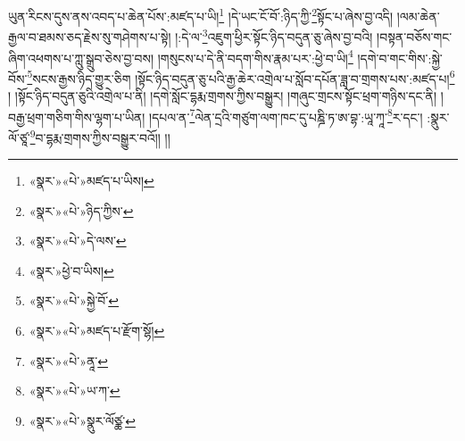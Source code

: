 ཡུན་རིངས་དུས་ནས་འབད་པ་ཆེན་པོས་:མཛད་པ་ཡི།\footnote{«སྣར་»«པེ་»མཛད་པ་ཡིས།} །དེ་ཡང་ངོ་བོ་:ཉིད་ཀྱི་\footnote{«སྣར་»«པེ་»ཉིད་ཀྱིས་}སྟོང་པ་ཞེས་བྱ་འདི། །ལམ་ཆེན་རྒྱལ་བ་ཐམས་ཅད་རྗེས་སུ་གཤེགས་པ་སྟེ། །:དེ་ལ་\footnote{«སྣར་»«པེ་»དེ་ལས་}འཇུག་ཕྱིར་སྟོང་ཉིད་བདུན་ཅུ་ཞེས་བྱ་བའི། །བསྟན་བཅོས་གང་ཞིག་འཕགས་པ་ཀླུ་སྒྲུབ་ཅེས་བྱ་བས། །གསུངས་པ་དེ་ནི་བདག་གིས་རྣམ་པར་:ཕྱེ་བ་ཡི།\footnote{«སྣར་»ཕྱེ་བ་ཡིས།} །དགེ་བ་གང་གིས་:སྐྱེ་བོས་\footnote{«སྣར་»«པེ་»སྐྱེ་བོ་}སངས་རྒྱས་ཉིད་གྱུར་ཅིག །སྟོང་ཉིད་བདུན་ཅུ་པའི་རྒྱ་ཆེར་འགྲེལ་པ་སློབ་དཔོན་ཟླ་བ་གྲགས་པས་:མཛད་པ།\footnote{«སྣར་»«པེ་»མཛད་པ་རྫོག་སྷོ།} ། །སྟོང་ཉིད་བདུན་ཅུའི་འགྲེལ་པ་ནི། །དགེ་སློང་དྷརྨ་གྲགས་ཀྱིས་བསྒྱུར། །གཞུང་གྲངས་སྟོང་ཕྲག་གཉིས་དང་ནི། །བརྒྱ་ཕྲག་གཅིག་གིས་ལྷག་པ་ཡིན། །དཔལ་ན་\footnote{«སྣར་»«པེ་»ནཱ་}ལེན་དྲའི་གཙུག་ལག་ཁང་དུ་པཎྜི་ཏ་ཨ་བྷ་:ཡཱ་ཀཱ་\footnote{«སྣར་»«པེ་»ཡ་ཀ་}ར་དང་། :སྣུར་ལོ་ཙཱ་\footnote{«སྣར་»«པེ་»སྣུར་ལོཙྪ་}བ་དྷརྨ་གྲགས་ཀྱིས་བསྒྱུར་བའོ།། །།